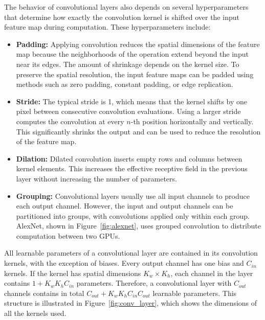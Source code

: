 The behavior of convolutional layers also depends on several hyperparameters that determine how exactly the convolution kernel is shifted over the input feature map during computation. These hyperparameters include:
\begin{itemize}
    \item \textbf{Padding:} Applying convolution reduces the spatial dimensions of the feature map because the neighborhoods of the operation extend beyond the input near its edges. The amount of shrinkage depends on the kernel size. To preserve the spatial resolution, the input feature maps can be padded using methods such as zero padding, constant padding, or edge replication.

    \item \textbf{Stride:} The typical stride is 1, which means that the kernel shifts by one pixel between consecutive convolution evaluations. Using a larger stride computes the convolution at every $n$-th position horizontally and vertically. This significantly shrinks the output and can be used to reduce the resolution of the feature map.
    
    \item \textbf{Dilation:} Dilated convolution inserts empty rows and columns between kernel elements. This increases the effective receptive field in the previous layer without increasing the number of parameters.

    \item \textbf{Grouping:} Convolutional layers usually use all input channels to produce each output channel. However, the input and output channels can be partitioned into groups, with convolutions applied only within each group. AlexNet, shown in Figure~\ref{fig:alexnet}, uses grouped convolution to distribute computation between two GPUs.
\end{itemize}

All learnable parameters of a convolutional layer are contained in its convolution kernels, with the exception of biases. Every output channel has one bias and $C_{in}$ kernels. If the kernel has spatial dimensions $K_w \times K_h$, each channel in the layer contains $1 + K_wK_hC_{in}$ parameters. Therefore, a convolutional layer with $C_{out}$ channels contains in total $C_{out} + K_wK_hC_{in}C_{out}$ learnable parameters. This structure is illustrated in Figure~\ref{fig:conv_layer}, which shows the dimensions of all the kernels used.~\cite{Szeliski2022, Krichen2023}


